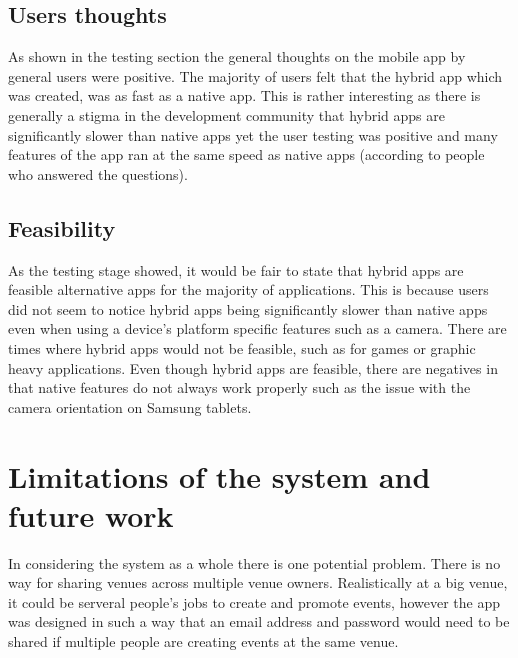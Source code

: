 \subsection{Users thoughts}
As shown in the testing section the general thoughts on the mobile app by general users were positive. The majority of users felt that the hybrid app which was created, was as fast as a native app. This is rather interesting as there is generally a stigma in the development community that hybrid apps are significantly slower than native apps \cite{hybridcrap} yet the user testing was positive and many features of the app ran at the same speed as native apps (according to people who answered the questions). 

\subsection{Feasibility}
As the testing stage showed, it would be fair to state that hybrid apps are feasible alternative apps for the majority of applications. This is because users did not seem to notice hybrid apps being significantly slower than native apps even when using a device's platform specific features such as a camera. There are times where hybrid apps would not be feasible, such as for games or graphic heavy applications. Even though hybrid apps are feasible, there are negatives in that native features do not always work properly such as the issue with the camera orientation on Samsung tablets.

\section{Limitations of the system and future work}
In considering the system as a whole there is one potential problem. There is no way for sharing venues across multiple venue owners. Realistically at a big venue, it could be serveral people's jobs to create and promote events, however the app was designed in such a way that an email address and password would need to be shared if multiple people are creating events at the same venue.

